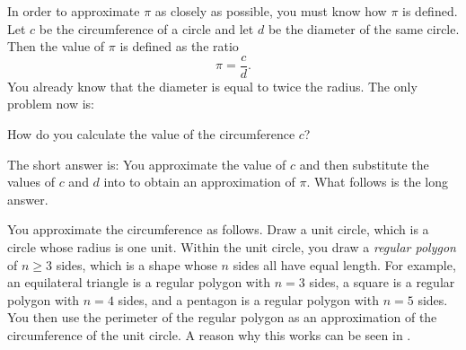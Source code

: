 \documentclass[a4paper,oneside,12pt]{article}
\begin{document}
In order to approximate $\pi$ as closely as possible, you must know
how $\pi$ is defined.  Let $c$ be the circumference of a circle and
let $d$ be the diameter of the same circle.  Then the value of $\pi$
is defined as the ratio
\begin{equation}
\label{eqn:define_pi_as_ratio_of_c_over_d}
\pi
=
\frac{c}{d}.
\end{equation}
You already know that the diameter is equal to twice the radius.  The
only problem now is:
\begin{packeditem}
\item How do you calculate the value of the circumference $c$?
\end{packeditem}
The short answer is: You approximate the value of $c$ and then
substitute the values of $c$ and $d$ into
 to obtain an
approximation of $\pi$.  What follows is the long answer.

You approximate the circumference as follows.  Draw a unit circle,
which is a circle whose radius is one unit.  Within the unit circle,
you draw a \emph{regular polygon} of $n \geq 3$ sides, which is a
shape whose $n$ sides all have equal length.  For example, an
equilateral triangle is a regular polygon with $n = 3$ sides, a square
is a regular polygon with $n = 4$ sides, and a pentagon is a regular
polygon with $n = 5$ sides.  You then use the perimeter of the regular
polygon as an approximation of the circumference of the unit circle.
A reason why this works can be seen in
.
\end{document}
